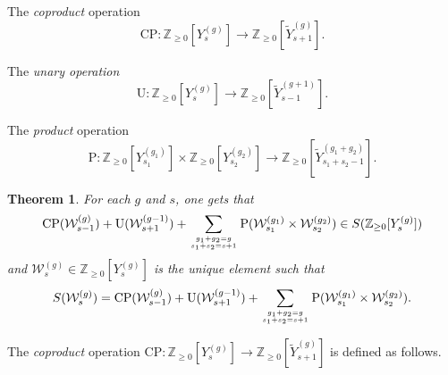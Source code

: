 \documentclass[11pt]{article}
\def\beq{\begin{equation}}
\def\eeq{\end{equation}}
\theoremstyle{plain}
\newtheorem{theorem}{Theorem}
\theoremstyle{definition}
\def\beq{\begin{equation}}
\def\eeq{\end{equation}}
\begin{document}
\noindent The \emph{coproduct} operation 
$$\mathrm{CP}: {\mathbb Z}_{\ge0}[Y^{(g)}_{s} ]\to {\mathbb Z}_{\ge0}[\widetilde Y^{(g)}_{s+1} ].$$

\noindent The  \emph{unary operation} $$\mathrm{U}:  {\mathbb Z}_{\ge0}[Y^{(g)}_{s} ]\to {\mathbb Z}_{\ge0}[\widetilde Y^{(g+1)}_{s-1} ].$$

\noindent The \emph{product} operation
$$
 \mathrm{P}:  {\mathbb Z}_{\ge0}[Y^{(g_1)}_{s_1}]\times {\mathbb Z}_{\ge0}[Y^{(g_2)}_{s_2} ]\to 
 {\mathbb Z}_{\ge0}[\widetilde Y^{(g_1+g_2)}_{s_1+s_2-1} ].
 $$



\begin{theorem}
For each $g$ and $s$, one gets that
$$
\mathrm{CP}({\mathcal W}^{(g)}_{s-1})+\mathrm{U}({\mathcal W}^{(g-1)}_{s+1})+\sum_{g_1+g_2=g\atop s_1+s_2=s+1}
\mathrm{P}({\mathcal W}^{(g_1)}_{s_1}\times {\mathcal W}^{(g_2)}_{s_2}) \in S({\mathbb Z}_{\ge0}[Y^{(g)}_{s} ])
$$
and ${\mathcal W}^{(g)}_{s} \in {\mathbb Z}_{\ge0}[Y^{(g)}_{s} ]$ is the unique element such that
\beq
S({\mathcal W}^{(g)}_{s}) = \mathrm{CP}({\mathcal W}^{(g)}_{s-1})+\mathrm{U}({\mathcal W}^{(g-1)}_{s+1})+\sum_{g_1+g_2=g\atop s_1+s_2=s+1}
\mathrm{P}({\mathcal W}^{(g_1)}_{s_1}\times {\mathcal W}^{(g_2)}_{s_2}).
\label{th-7}
\eeq
\end{theorem}



The \emph{coproduct} operation $\mathrm{CP}: {\mathbb Z}_{\ge0}[Y^{(g)}_{s} ]\to {\mathbb Z}_{\ge0}[\widetilde Y^{(g)}_{s+1} ]$ is defined as follows.  
\end{document}
